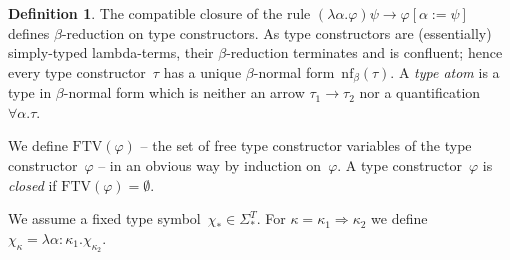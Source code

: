 \documentclass[a4paper,UKenglish,cleveref,autoref,numberwithinsect]{lipics-v2019}
\theoremstyle{definition}
\newtheorem{defn}[theorem]{Definition}
\newcommand{\arrkind}{\Rightarrow}
\newcommand{\arrtype}{\rightarrow}
\newcommand{\FTV}{\mathrm{FTV}}
\newcommand{\nf}{\mathrm{nf}}
\begin{document}
\begin{defn}
  The compatible closure of the rule $(\lambda\alpha.\varphi)\psi \to
  \varphi[\alpha := \psi]$ defines $\beta$-reduction on type
  constructors. As type constructors are (essentially) simply-typed
  lambda-terms, their $\beta$-reduction terminates
  and is confluent; hence every type constructor~$\tau$ has a unique
  $\beta$-normal form~$\nf_\beta(\tau)$. A \emph{type atom} is a type
  in $\beta$-normal form which is neither an arrow $\tau_1\arrtype\tau_2$
  nor a quantification $\forall\alpha.\tau$.

  We define $\FTV(\varphi)$ -- the set of free type constructor
  variables of the type constructor~$\varphi$ -- in an obvious way by
  induction on~$\varphi$. A type constructor~$\varphi$ is
  \emph{closed} if $\FTV(\varphi) = \emptyset$.

  We assume a fixed type symbol~$\chi_* \in
  \Sigma^T_*$. For $\kappa=\kappa_1\arrkind\kappa_2$ we define
  $\chi_\kappa = \lambda \alpha:\kappa_1 . \chi_{\kappa_2}$.
\end{defn}
\end{document}

